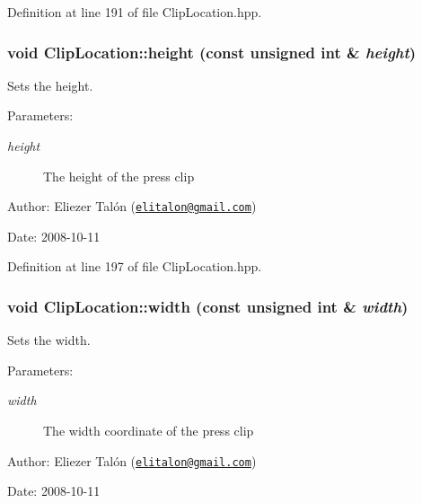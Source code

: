 Definition at line 191 of file ClipLocation.hpp.\hypertarget{class_clip_location_f0e979e989c1cecbca6fe2da92b383f7}{
\subsubsection[height]{\setlength{\rightskip}{0pt plus 5cm}void ClipLocation::height (const unsigned int \& {\em height})}}
\label{class_clip_location_f0e979e989c1cecbca6fe2da92b383f7}


Sets the height. 

\begin{Desc}
\item[Parameters:]
\begin{description}
\item[{\em height}]The height of the press clip\end{description}
\end{Desc}
\begin{Desc}
\item[Author:]Eliezer Talón (\href{mailto:elitalon@gmail.com}{\tt elitalon@gmail.com}) \end{Desc}
\begin{Desc}
\item[Date:]2008-10-11 \end{Desc}


Definition at line 197 of file ClipLocation.hpp.\hypertarget{class_clip_location_7dc15a35acc1594dfc1e5f64ca33d3b9}{
\subsubsection[width]{\setlength{\rightskip}{0pt plus 5cm}void ClipLocation::width (const unsigned int \& {\em width})}}
\label{class_clip_location_7dc15a35acc1594dfc1e5f64ca33d3b9}


Sets the width. 

\begin{Desc}
\item[Parameters:]
\begin{description}
\item[{\em width}]The width coordinate of the press clip\end{description}
\end{Desc}
\begin{Desc}
\item[Author:]Eliezer Talón (\href{mailto:elitalon@gmail.com}{\tt elitalon@gmail.com}) \end{Desc}
\begin{Desc}
\item[Date:]2008-10-11 \end{Desc}


